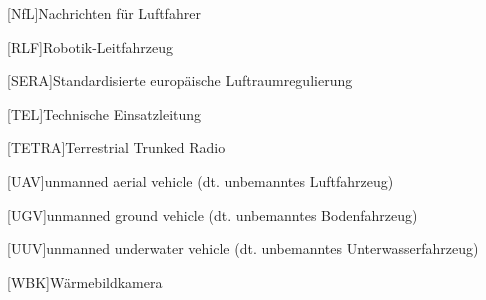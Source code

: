 \begin{acronym}[EuGH]
[NfL]{Nachrichten für Luftfahrer}

[RLF]{Robotik-Leitfahrzeug}

[SERA]{Standardisierte europäische Luftraumregulierung}

[TEL]{Technische Einsatzleitung}

[TETRA]{Terrestrial Trunked Radio}

[UAV]{unmanned aerial vehicle (dt. unbemanntes Luftfahrzeug)}

[UGV]{unmanned ground vehicle (dt. unbemanntes Bodenfahrzeug)}

[UUV]{unmanned underwater vehicle (dt. unbemanntes Unterwasserfahrzeug)}

[WBK]{Wärmebildkamera}

\end{acronym}